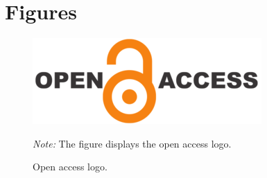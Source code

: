 \setcounter{figure}{0}
\label{subsec:Figures}

\FloatBarrier
\newpage
\section*{Figures}

\begin{figure}[phtb] %
{ \centering
\includegraphics[width=\textwidth]{output/figures/open_access_logo.png}	
\caption{Open access logo.} \label{fig:openaccesslogo}
}
{\indent \textit{Note:} The figure displays the open access logo.}
\end{figure}

\clearpage
